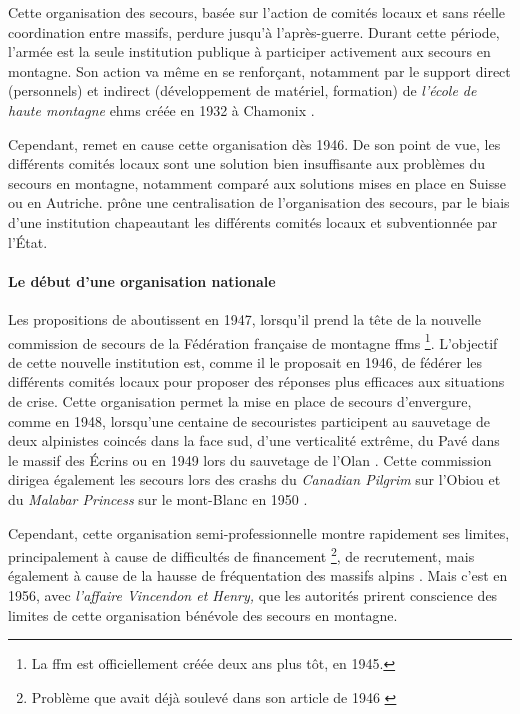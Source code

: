 Cette organisation des secours, basée sur l'action de comités locaux
et sans réelle coordination entre massifs, perdure jusqu'à
l'après-guerre. Durant cette période, l'armée est la seule institution
publique à participer activement aux secours en montagne. Son action
va même en se renforçant, notamment par le support direct (personnels)
et indirect (développement de matériel, formation) de \emph{l'école de
  haute montagne} \acp{ehm} créée en 1932 à Chamonix
\autocite{Mezin2016}.

Cependant, \textcite{Devies1946} remet en cause cette organisation dès
1946. De son point de vue, les différents comités locaux sont une
solution bien insuffisante aux problèmes du secours en montagne,
notamment comparé aux solutions mises en place en Suisse ou en
Autriche.  prône une centralisation de l'organisation des
secours, par le biais d'une institution chapeautant les différents
comités locaux et subventionnée par l'État.

\paragraph{Le début d'une organisation nationale}

Les propositions de  aboutissent en 1947, lorsqu'il prend
la tête de la nouvelle commission de secours de la Fédération
française de montagne \acp{ffm} \footnote{La \ac{ffm} est
  officiellement créée deux ans plus tôt, en 1945.}. L'objectif de
cette nouvelle institution est, comme il le proposait en 1946, de
fédérer les différents comités locaux pour proposer des réponses plus
efficaces aux situations de crise. Cette organisation permet la mise
en place de secours d'envergure, comme en 1948, lorsqu'une centaine de
secouristes participent au sauvetage de deux alpinistes coincés dans
la face sud, d'une verticalité extrême, du Pavé dans le massif des
Écrins \autocite{Romanaz2018} ou en 1949 lors du sauvetage de l'Olan
\autocite{Mollaret1993}. Cette commission dirigea également les
secours lors des crashs du \emph{Canadian Pilgrim} sur l'Obiou et du
\emph{Malabar Princess} sur le mont-Blanc en 1950
\autocite{CFDLD,Mollaret1993,SDSM2013}.

Cependant, cette organisation semi-professionnelle montre rapidement
ses limites, principalement à cause de difficultés de financement
\footnote{Problème que  avait déjà soulevé dans son
  article de 1946 \autocite{Devies1946}}, de recrutement, mais
également à cause de la hausse de fréquentation des massifs alpins
\autocite{CFDLD}. Mais c'est en 1956, avec \emph{l'affaire Vincendon
  et Henry,} que les autorités prirent conscience des limites de cette
organisation bénévole des secours en montagne.

